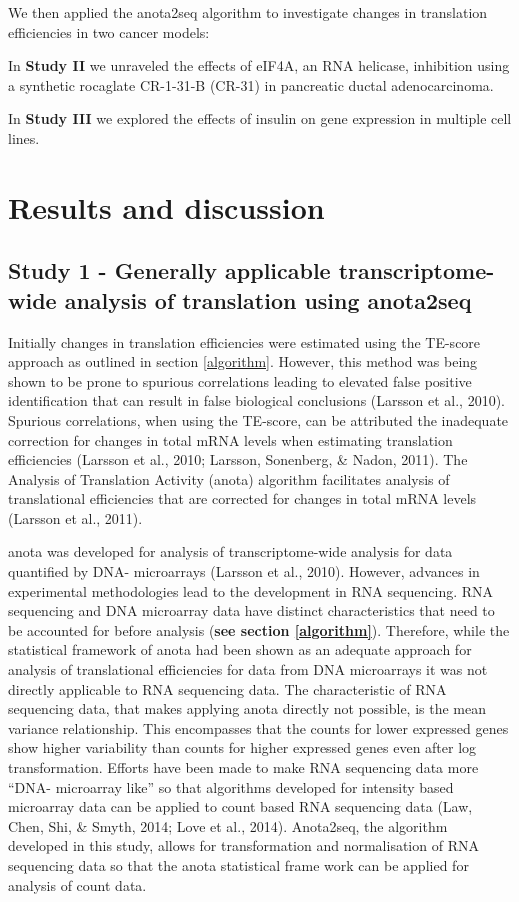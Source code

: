 \documentclass[12pt,openany]{book}
\begin{document}
We then applied the anota2seq algorithm to investigate changes in
translation efficiencies in two cancer models:

In \textbf{Study II} we unraveled the effects of eIF4A, an RNA helicase,
inhibition using a synthetic rocaglate CR-1-31-B (CR-31) in pancreatic
ductal adenocarcinoma.

In \textbf{Study III} we explored the effects of insulin on gene
expression in multiple cell lines.

\chapter{Results and discussion}

\section{Study 1 - Generally applicable transcriptome-wide analysis of translation using anota2seq}

Initially changes in translation efficiencies were estimated using the
TE-score approach as outlined in section \ref{algorithm}. However, this
method was being shown to be prone to spurious correlations leading to
elevated false positive identification that can result in false
biological conclusions (Larsson et al., 2010). Spurious correlations,
when using the TE-score, can be attributed the inadequate correction for
changes in total mRNA levels when estimating translation efficiencies
(Larsson et al., 2010; Larsson, Sonenberg, \& Nadon, 2011). The Analysis
of Translation Activity (anota) algorithm facilitates analysis of
translational efficiencies that are corrected for changes in total mRNA
levels (Larsson et al., 2011).

anota was developed for analysis of transcriptome-wide analysis for data
quantified by DNA- microarrays (Larsson et al., 2010). However, advances
in experimental methodologies lead to the development in RNA sequencing.
RNA sequencing and DNA microarray data have distinct characteristics
that need to be accounted for before analysis (\textbf{see section
\ref{algorithm}}). Therefore, while the statistical framework of anota
had been shown as an adequate approach for analysis of translational
efficiencies for data from DNA microarrays it was not directly
applicable to RNA sequencing data. The characteristic of RNA sequencing
data, that makes applying anota directly not possible, is the mean
variance relationship. This encompasses that the counts for lower
expressed genes show higher variability than counts for higher expressed
genes even after log transformation. Efforts have been made to make RNA
sequencing data more ``DNA- microarray like'' so that algorithms
developed for intensity based microarray data can be applied to count
based RNA sequencing data (Law, Chen, Shi, \& Smyth, 2014; Love et al.,
2014). Anota2seq, the algorithm developed in this study, allows for
transformation and normalisation of RNA sequencing data so that the
anota statistical frame work can be applied for analysis of count data.
\end{document}
